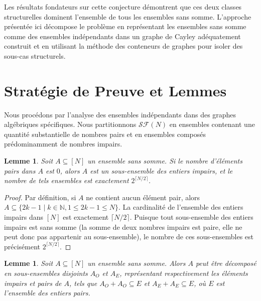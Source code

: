 \documentclass[12pt, a4paper]{article}
\newtheorem{lemma}[theorem]{Lemme}
\begin{document}
Les r\'esultats fondateurs sur cette conjecture d\'emontrent que ces deux classes structurelles dominent l'ensemble de tous les ensembles sans somme. L'approche pr\'esent\'ee ici d\'ecompose le probl\`eme en repr\'esentant les ensembles sans somme comme des ensembles ind\'ependants dans un graphe de Cayley ad\'equatement construit et en utilisant la m\'ethode des conteneurs de graphes pour isoler des sous-cas structurels.

\section{Strat\'egie de Preuve et Lemmes}

Nous proc\'edons par l'analyse des ensembles ind\'ependants dans des graphes alg\'ebriques sp\'ecifiques. Nous partitionnons $\mathcal{SF}(N)$ en ensembles contenant une quantit\'e substantielle de nombres pairs et en ensembles compos\'es pr\'edominamment de nombres impairs.

\begin{lemma}
Soit $A \subseteq [N]$ un ensemble sans somme. Si le nombre d'\'el\'ements pairs dans $A$ est $0$, alors $A$ est un sous-ensemble des entiers impairs, et le nombre de tels ensembles est exactement $2^{\lceil N/2 \rceil}$.
\end{lemma}

\begin{proof}
Par d\'efinition, si $A$ ne contient aucun \'el\'ement pair, alors $A \subseteq \{2k-1 \mid k \in \mathbb{N}, 1 \le 2k-1 \le N\}$.
La cardinalit\'e de l'ensemble des entiers impairs dans $[N]$ est exactement $\lceil N/2 \rceil$.
Puisque tout sous-ensemble des entiers impairs est sans somme (la somme de deux nombres impairs est paire, elle ne peut donc pas appartenir au sous-ensemble), le nombre de ces sous-ensembles est pr\'ecis\'ement $2^{\lceil N/2 \rceil}$.
\end{proof}

\begin{lemma}
Soit $A \subseteq [N]$ un ensemble sans somme. Alors $A$ peut \^etre d\'ecompos\'e en sous-ensembles disjoints $A_O$ et $A_E$, repr\'esentant respectivement les \'el\'ements impairs et pairs de $A$, tels que $A_O + A_O \subseteq E$ et $A_E + A_E \subseteq E$, o\`u $E$ est l'ensemble des entiers pairs.
\end{lemma}
\end{document}
